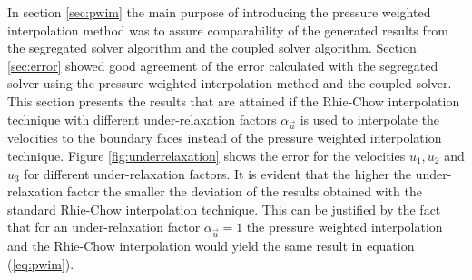 In section \ref{sec:pwim} the main purpose of introducing the pressure weighted interpolation method was to assure comparability of the generated results from the segregated solver algorithm and the coupled solver algorithm. Section \ref{sec:error} showed good agreement of the error calculated with the segregated solver using the pressure weighted interpolation method and the coupled solver. This section presents the results that are attained if the Rhie-Chow interpolation technique with different under-relaxation factors \(\alpha_\vec{u}\) is used to interpolate the velocities to the boundary faces instead of the pressure weighted interpolation technique. Figure \ref{fig:underrelaxation} shows the error for the velocities \(u_1, u_2\) and \(u_3\) for different under-relaxation factors. It is evident that the higher the under-relaxation factor the smaller the deviation of the results obtained with the standard Rhie-Chow interpolation technique. This can be justified by the fact that for an under-relaxation factor \(\alpha_\vec{u} = 1\) the pressure weighted interpolation and the Rhie-Chow interpolation would yield the same result in equation (\ref{eq:pwim}).

